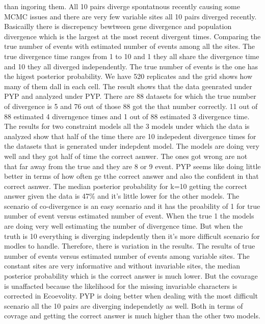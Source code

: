 \documentclass[letterpaper,12pt]{article}
\begin{document}
than ingoring them. All 10 pairs diverge spontatnous recently causing some MCMC issues and there 
are very few variable sites all 10 pairs diverged recently. Basicailly there is discrepency bewtween 
gene divergence and population divergence which is the largest at the most recent divergent times.
Comparing the true number of events with estimated number of events among all the sites. The true 
divergence time ranges from 1 to 10 and 1 they all share the divergence time and 10 they all 
diverged independently. The true number of events is the one has the higest posterior probability.
We have 520 replicates and the grid shows how many of them dall in each cell. The result shows 
that the data geenrated under PYP and analyzed under PYP. There are 88 datasets for which the true 
number of divergence is 5 and 76 out of those 88 got the that number correctly. 11 out of 88 
estimated 4 diverngence times and 1 out of 88 estimated 3 divergence time. 
The results for two constraint models all the 3 models under which the data is analyzed show that 
half of the time there are 10 indepedent divergence times for the datasets that is generated under 
indepdent model. The models are doing very well and they got half of time the correct asnwer. The 
ones got wrong are not that far away from the true and they are 8 or 9 event. PYP seems like 
doing little better in terms of how often ge tthe correct answer and also the confident in that 
correct asnwer. The median posterior probability for k=10 getting the correct answer
given the data is 47\% and it's little lower for the other models. The scenario of co-divergence
is an easy scenario and it has the proability of 1 for true number of event versus estimated number of 
event. When the true 1 the models are doing very well estimating the number of divergence time. But 
when the truth is 10 everything is diverging indepdently then it's more difficult scenario for 
modles to handle. Therefore, there is variation in the results. 
The results of true number of events versus estimated number of events among variable sites. The
constant sites are very informative and without invariable sites, the median posterior probability
which is the correct answer is much lower. But the covarage is unaffacted because the 
likelihood for the missing invariable characters is corrected in Ecoevolity. PYP is doing better when 
dealing with the most difficult scenario all the 10 pairs are diverging independetly as well. Both in
terms of covrage and getting the correct answer is much higher than the other two models. 
\end{document}
